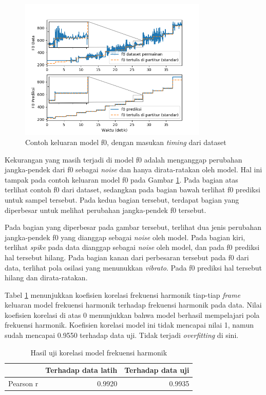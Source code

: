 \begin{figure}[h]
    \centering
    \includegraphics[width=0.8\textwidth]{resources/Analisis_F0.png}
    \caption{Contoh keluaran model f0, dengan masukan \textit{timing} dari dataset}\label{fig-f0-output-sample}
\end{figure}

Kekurangan yang masih terjadi di model f0 adalah menganggap perubahan jangka-pendek dari f0 sebagai \textit{noise} dan hanya dirata-ratakan oleh model. Hal ini tampak pada contoh keluaran model f0 pada Gambar \ref{fig-f0-output-sample}. Pada bagian atas terlihat contoh f0 dari dataset, sedangkan pada bagian bawah terlihat f0 prediksi untuk sampel tersebut. Pada kedua bagian tersebut, terdapat bagian yang diperbesar untuk melihat perubahan jangka-pendek f0 tersebut. 

Pada bagian yang diperbesar pada gambar tersebut, terlihat dua jenis perubahan jangka-pendek f0 yang dianggap sebagai \textit{noise} oleh model. Pada bagian kiri, terlihat \textit{spike} pada data dianggap sebagai \textit{noise} oleh model, dan pada f0 prediksi hal tersebut hilang. Pada bagian kanan dari perbesaran tersebut pada f0 dari data, terlihat pola osilasi yang menunukkan \textit{vibrato}. Pada f0 prediksi hal tersebut hilang dan dirata-ratakan.

Tabel \ref{tab-freq-testing-results} menunjukkan koefisien korelasi frekuensi harmonik tiap-tiap \textit{frame} keluaran model frekuensi harmonik terhadap frekuensi harmonik pada data. Nilai koefisien korelasi di atas 0 menunjukkan bahwa model berhasil mempelajari pola frekuensi harmonik. Koefisien korelasi model ini tidak mencapai nilai 1, namun sudah mencapai 0.9550 terhadap data uji. Tidak terjadi \textit{overfitting} di sini.
\begin{table}[htbp]
    \centering
    \caption{Hasil uji korelasi model frekuensi harmonik}\label{tab-freq-testing-results}
    \begin{tabular}{ |l|r|r| } 
     \cline{2-3}
     \multicolumn{1}{l|}{}&Terhadap data latih&Terhadap data uji\\\hline
	 Pearson r&0.9920  &0.9935\\\hline
    \end{tabular}
\end{table}


